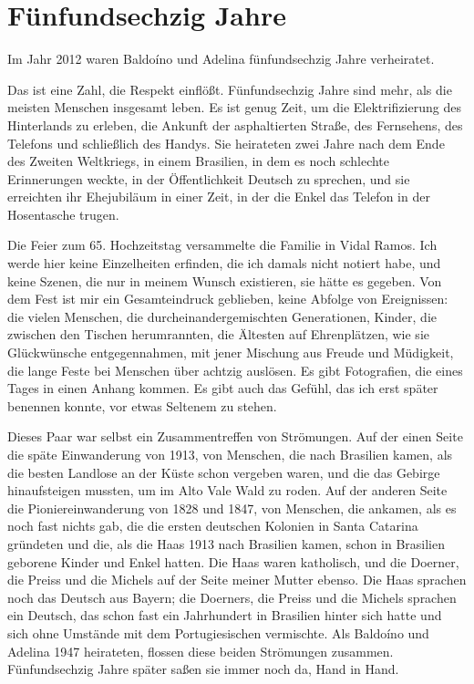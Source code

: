 \documentclass[
  ngerman,
  11pt,
  openany]{book}
\begin{document}
\section{Fünfundsechzig Jahre}\label{fuxfcnfundsechzig-jahre}

Im Jahr 2012 waren Baldoíno und Adelina fünfundsechzig Jahre
verheiratet.

Das ist eine Zahl, die Respekt einflößt. Fünfundsechzig Jahre sind mehr,
als die meisten Menschen insgesamt leben. Es ist genug Zeit, um die
Elektrifizierung des Hinterlands zu erleben, die Ankunft der
asphaltierten Straße, des Fernsehens, des Telefons und schließlich des
Handys. Sie heirateten zwei Jahre nach dem Ende des Zweiten Weltkriegs,
in einem Brasilien, in dem es noch schlechte Erinnerungen weckte, in der
Öffentlichkeit Deutsch zu sprechen, und sie erreichten ihr Ehejubiläum
in einer Zeit, in der die Enkel das Telefon in der Hosentasche trugen.

Die Feier zum 65. Hochzeitstag versammelte die Familie in Vidal Ramos.
Ich werde hier keine Einzelheiten erfinden, die ich damals nicht notiert
habe, und keine Szenen, die nur in meinem Wunsch existieren, sie hätte
es gegeben. Von dem Fest ist mir ein Gesamteindruck geblieben, keine
Abfolge von Ereignissen: die vielen Menschen, die
durcheinandergemischten Generationen, Kinder, die zwischen den Tischen
herumrannten, die Ältesten auf Ehrenplätzen, wie sie Glückwünsche
entgegennahmen, mit jener Mischung aus Freude und Müdigkeit, die lange
Feste bei Menschen über achtzig auslösen. Es gibt Fotografien, die eines
Tages in einen Anhang kommen. Es gibt auch das Gefühl, das ich erst
später benennen konnte, vor etwas Seltenem zu stehen.

Dieses Paar war selbst ein Zusammentreffen von Strömungen. Auf der einen
Seite die späte Einwanderung von 1913, von Menschen, die nach Brasilien
kamen, als die besten Landlose an der Küste schon vergeben waren, und
die das Gebirge hinaufsteigen mussten, um im Alto Vale Wald zu roden.
Auf der anderen Seite die Pioniereinwanderung von 1828 und 1847, von
Menschen, die ankamen, als es noch fast nichts gab, die die ersten
deutschen Kolonien in Santa Catarina gründeten und die, als die Haas
1913 nach Brasilien kamen, schon in Brasilien geborene Kinder und Enkel
hatten. Die Haas waren katholisch, und die Doerner, die Preiss und die
Michels auf der Seite meiner Mutter ebenso. Die Haas sprachen noch das
Deutsch aus Bayern; die Doerners, die Preiss und die Michels sprachen
ein Deutsch, das schon fast ein Jahrhundert in Brasilien hinter sich
hatte und sich ohne Umstände mit dem Portugiesischen vermischte. Als
Baldoíno und Adelina 1947 heirateten, flossen diese beiden Strömungen
zusammen. Fünfundsechzig Jahre später saßen sie immer noch da, Hand in
Hand.
\end{document}
